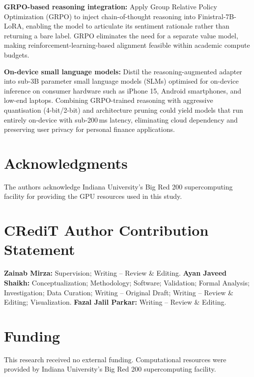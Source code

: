 \documentclass[a4paper]{article}
\begin{document}
\textbf{GRPO-based reasoning integration:} Apply Group Relative Policy Optimization (GRPO) \cite{shao2024deepseekmath} to inject chain-of-thought reasoning into Finistral-7B-LoRA, enabling the model to articulate its sentiment rationale rather than returning a bare label. GRPO eliminates the need for a separate value model, making reinforcement-learning-based alignment feasible within academic compute budgets.

\textbf{On-device small language models:} Distil the reasoning-augmented adapter into sub-3B parameter small language models (SLMs) optimised for on-device inference on consumer hardware such as iPhone 15, Android smartphones, and low-end laptops. Combining GRPO-trained reasoning with aggressive quantisation (4-bit/2-bit) and architecture pruning could yield models that run entirely on-device with sub-200\,ms latency, eliminating cloud dependency and preserving user privacy for personal finance applications.



\section*{Acknowledgments}

The authors acknowledge Indiana University's Big Red 200 supercomputing facility for providing the GPU resources used in this study.

\section*{CRediT Author Contribution Statement}

\noindent\textbf{Zainab Mirza:} Supervision; Writing -- Review \& Editing. \textbf{Ayan Javeed Shaikh:} Conceptualization; Methodology; Software; Validation; Formal Analysis; Investigation; Data Curation; Writing -- Original Draft; Writing -- Review \& Editing; Visualization. \textbf{Fazal Jalil Parkar:} Writing -- Review \& Editing.

\section*{Funding}

This research received no external funding. Computational resources were provided by Indiana University's Big Red 200 supercomputing facility.
\end{document}
